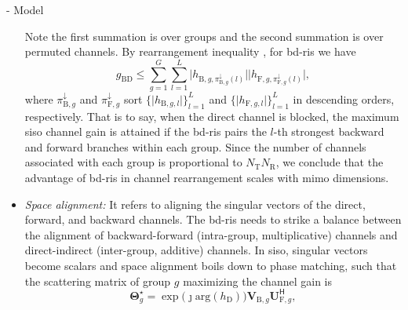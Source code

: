 \documentclass[journal]{IEEEtran}
\begin{document}
\begin{section}{- Model}
\begin{itemize}
		Note the first summation is over groups and the second summation is over permuted channels.
		By rearrangement inequality \cite[Inequality 10.2.1]{Hardy1952}, for \gls{bd}-\gls{ris} we have
		\begin{equation}
			g_\mathrm{BD} \le \sum_{g=1}^{G} \sum_{l=1}^{L} \lvert h_{\mathrm{B},g,\pi^\downarrow_{\mathrm{B},g}(l)} \rvert \lvert h_{\mathrm{F},g,\pi^\downarrow_{\mathrm{F},g}(l)} \rvert,
		\end{equation}
		where $\pi^\downarrow_{\mathrm{B},g}$ and $\pi^\downarrow_{\mathrm{F},g}$ sort $\{\lvert h_{\mathrm{B},g,l} \rvert\}_{l=1}^L$ and $\{\lvert h_{\mathrm{F},g,l} \rvert\}_{l=1}^L$ in descending orders, respectively.
		That is to say, when the direct channel is blocked,
		the maximum \gls{siso} channel gain is attained if the \gls{bd}-\gls{ris} pairs the $l$-th strongest backward and forward branches within each group.
		Since the number of channels associated with each group is proportional to $N_\mathrm{T} N_\mathrm{R}$, we conclude that {the advantage of \gls{bd}-\gls{ris} in channel rearrangement scales with \gls{mimo} dimensions.}
		\item \emph{Space alignment:} It refers to aligning the singular vectors of the direct, forward, and backward channels.
		The \gls{bd}-\gls{ris} needs to strike a balance between the alignment of backward-forward (intra-group, multiplicative) channels and direct-indirect (inter-group, additive) channels. In \gls{siso}, singular vectors become scalars and space alignment boils down to phase matching, such that the scattering matrix of group $g$ maximizing the channel gain is
		\begin{equation}
			\mathbf{\Theta}_g^\star = \exp \bigl(\jmath \mathrm{arg}(h_\mathrm{D})\bigr) \mathbf{V}_{\mathrm{B},g} \mathbf{U}_{\mathrm{F},g}^\mathsf{H},
			\label{eq:scattering_siso}
		\end{equation}

\end{itemize}
\end{section}
\end{document}
